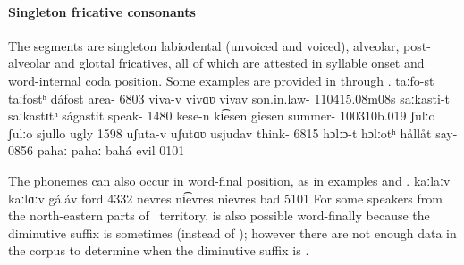 \paragraph{Singleton fricative consonants}\label{fvssjh}
The segments \mbox{} are singleton labiodental (unvoiced and voiced), alveolar, post-alveolar and glottal fricatives, all of which are attested in syllable onset and word-internal coda position. %
Some examples are provided in  through .
	{taː{f}o-st}		{taː{f}ostʰ}		{dáfost}	{area-}		{6803}
	{{v}i{v}a-v}	{{v}i{v}ɑʋ}		{vivav}	{son.in.law-}	{110415}{.08m08s}
		{{s}aːka{s}ti-t}	{{s}aːka{s}tɪtʰ}	{ságastit}	{speak-}		{1480}
	{ke{s}e-n}		{ki͡e{s}en}		{giesen}	{summer-}	{100310b}{.019}
			{{ʃ}ulːo}			{{ʃ}ulːo}			{sjullo}	{ugly\Sc{}}		{1598}
	{u{ʃ}uta-v}		{u{ʃ}utɑʋ}		{usjudav}	{think-}		{6815}
			{{h}ɔlːɔ-t}		{{h}ɔlːotʰ}		{hållåt}	{say-}	{0856}
		{pa{h}aː}		{pa{h}aː}		{bahá}	{evil\BS{}}	{0101}

The phonemes  can also occur in word-final position, as in examples  and .%
	{kaːlaː{v}}	{kaːlɑː{v}}	{gáláv}	{ford\BS{}}	{4332}
		{nevre{s}}	{ni͡evre{s}}	{nievres}	{bad\Sc{}}	{5101}
For some speakers from the north-eastern parts of \PS\ territory,  is also possible word-finally because the diminutive suffix is sometimes (instead of ); however there are not enough data in the corpus to determine when the diminutive suffix is . 

